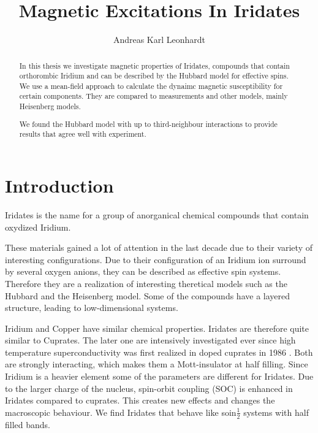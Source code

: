 \documentclass[a4paper,10pt]{report}
\title{Magnetic Excitations In Iridates}
\author{Andreas Karl Leonhardt}
\begin{document}

\begin{abstract}
In this thesis we investigate magnetic properties of Iridates, 
compounds that contain orthorombic Iridium and can be described by the Hubbard model for effective spins.
We use a mean-field approach to calculate the dynaimc magnetic susceptibility for certain components.
They are compared to measurements and other models, mainly Heisenberg models. 

We found the Hubbard model with up to third-neighbour interactions to provide results that agree well with experiment.
\end{abstract}


\tableofcontents

\chapter{Introduction}

Iridates is the name for a group of anorganical chemical compounds that contain oxydized Iridium.

These materials gained a lot of attention in the last decade due to their variety of interesting configurations.
Due to their configuration of an Iridium ion surround by several oxygen anions, they can be described as effective spin systems.
Therefore they are a realization of interesting theretical models such as the Hubbard and the Heisenberg model.
Some of the compounds have a layered structure, leading to low-dimensional systems.

Iridium and Copper have similar chemical properties. Iridates are therefore quite similar to Cuprates. 
The later one are intensively investigated ever since high temperature superconductivity was first realized in doped cuprates in 1986 \cite{}.
Both are strongly interacting, which makes them a Mott-insulator at half filling.
Since Iridium is a heavier element some of the parameters are different for Iridates. 
Due to the larger charge of the nucleus, spin-orbit coupling (SOC) is enhanced in Iridates compared to cuprates.
This creates new effects and changes the macroscopic behaviour. 
We find Iridates that behave like soin$\frac12$ systems with half filled bands. 
\end{document}
